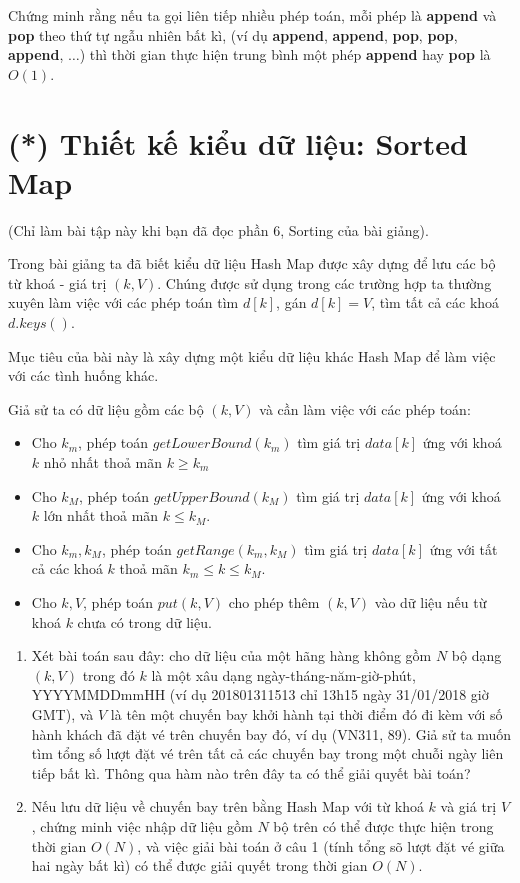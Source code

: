 \documentclass{article}
\begin{document}
\begin{em}
        Chứng minh rằng nếu ta gọi liên tiếp nhiều phép toán, mỗi phép là \textbf{append} và \textbf{pop} theo thứ tự ngẫu nhiên bất kì, (ví dụ \textbf{append}, \textbf{append}, \textbf{pop}, \textbf{pop}, \textbf{append}, $\ldots$) thì thời gian thực hiện trung bình một phép \textbf{append} hay \textbf{pop} là $O(1)$. 
\end{em}

\section{(*) Thiết kế kiểu dữ liệu: Sorted Map}

(Chỉ làm bài tập này khi bạn đã đọc phần 6, Sorting của bài giảng).

Trong bài giảng ta đã biết kiểu dữ liệu Hash Map được xây dựng để lưu các bộ từ khoá - giá trị $(k, V)$. Chúng được sử dụng trong các trường hợp ta thường xuyên làm việc với các phép toán tìm $d[k]$, gán $d[k] = V$, tìm tất cả các khoá $d.keys()$.

Mục tiêu của bài này là xây dựng một kiểu dữ liệu khác Hash Map để làm việc với các tình huống khác.

Giả sử ta có dữ liệu gồm các bộ $(k, V)$ và cần làm việc với các phép toán:
\begin{itemize}
    \item Cho $k_m$, phép toán $getLowerBound(k_m)$ tìm giá trị $data[k]$ ứng với khoá $k$ nhỏ nhất thoả mãn $k \geq k_m$
    \item Cho $k_M$, phép toán $getUpperBound(k_M)$ tìm giá trị $data[k]$ ứng với khoá $k$ lớn nhất thoả mãn $k \leq k_M$. 
    \item Cho $k_m, k_M$, phép toán $getRange(k_m, k_M)$ tìm giá trị $data[k]$ ứng với tất cả các khoá $k$ thoả mãn $k_m \leq k \leq k_M$.
    \item Cho $k, V$, phép toán $put(k, V)$ cho phép thêm $(k, V)$ vào dữ liệu nếu từ khoá $k$ chưa có trong dữ liệu.

\end{itemize}{}

 \begin{em}
	\begin{enumerate}
        \item Xét bài toán sau đây: cho dữ liệu của một hãng hàng không gồm $N$ bộ dạng $(k, V)$ trong đó $k$ là một xâu dạng ngày-tháng-năm-giờ-phút, YYYYMMDDmmHH (ví dụ 201801311513 chỉ 13h15 ngày 31/01/2018 giờ GMT), và $V$ là tên một chuyến bay khởi hành tại thời điểm đó đi kèm với số hành khách đã đặt vé trên chuyến bay đó, ví dụ (VN311, 89). Giả sử ta muốn tìm tổng số lượt đặt vé trên tất cả các chuyến bay trong một chuỗi ngày liên tiếp bất kì. Thông qua hàm nào trên đây ta có thể giải quyết bài toán?
		
		\item Nếu lưu dữ liệu về chuyến bay trên bằng Hash Map với từ khoá $k$ và giá trị $V$, chứng minh việc nhập dữ liệu gồm $N$ bộ trên có thể được thực hiện trong thời gian $O(N)$, và việc giải bài toán ở câu 1 (tính tổng sõ lượt đặt vé giữa hai ngày bất kì) có thể được giải quyết trong thời gian $O(N)$.
	\end{enumerate}
\end{em}
\end{document}
